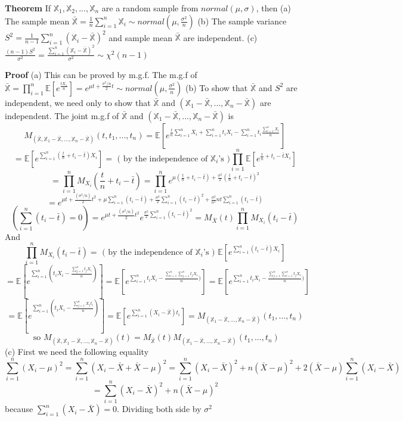\documentclass[a4paper,12pt]{article}
\begin{document}
\textbf{Theorem} If $\mathbb{X}_1, \mathbb{X}_2, ..., \mathbb{X}_n$ are a random sample from $normal(\mu, \sigma)$, then 
(a) The sample mean $\bar{\mathbb{X}} = \frac{1}{n}\sum_{i=1}^n\mathbb{X}_i \sim normal(\mu, \frac{\sigma^2}{n})$ 
(b) The sample variance $S^2 = \frac{1}{n-1} \sum_{i=1}^n (\mathbb{X}_i-\bar{\mathbb{X}})^2$ and sample mean $\bar{\mathbb{X}}$ are independent. 
(c) $\frac{(n-1)S^2}{\sigma^2} = \frac{\sum_{i=1}^n (\mathbb{X}_i-\bar{\mathbb{X}})^2}{\sigma^2} \sim \chi^2(n-1)$ 

\textbf{Proof} 
(a) This can be proved by m.g.f. The m.g.f of $\bar{\mathbb{X}} = \prod_{i=1}^n \mathbb{E}[e^{\frac{tX_1}{n}}] = e^{\mu t + \frac{\sigma^2 / n}{2}t} \sim normal(\mu, \frac{\sigma^2}{n})$ 
(b) To show that $\bar{\mathbb{X}}$ and $S^2$ are independent, we need only to show that $\bar{\mathbb{X}}$ and $(\mathbb{X}_1-\bar{\mathbb{X}}, ..., \mathbb{X}_n-\bar{\mathbb{X}})$ are independent.
The joint m.g.f of $\bar{\mathbb{X}}$ and $(\mathbb{X}_1-\bar{\mathbb{X}}, ..., \mathbb{X}_n-\bar{\mathbb{X}})$ is
$$M_{(\bar{\mathbb{X}}, \mathbb{X}_1-\bar{\mathbb{X}}, ..., \mathbb{X}_n-\bar{\mathbb{X}})}( t, t_1, ..., t_n ) = \mathbb{E}[e^{ \frac{t}{n}\sum_{i=1}^n X_i + \sum_{i=1}^n t_i X_i - \sum_{i=1}^n t_i \frac{\sum_{i=1}^n X_i}{n} }]$$
$$= \mathbb{E}[e^{\sum_{i=1}^n( \frac{t}{n}+t_i-\bar{t} )X_i}] = \text{ ( by the independence of } \mathbb{X}_i \text{'s )} \prod_{i=1}^n \mathbb{E}[e^{\frac{t}{n}+t_i-\bar{t} X_i}]$$
$$= \prod_{i=1}^n M_{X_i}(\frac{t}{n}+t_i-\bar{t}) = \prod_{i=1}^n e^{\mu (\frac{t}{n}+t_i-\bar{t}) + \frac{\sigma^2}{2} (\frac{t}{n}+t_i-\bar{t})^2 }$$
$$= e^{ \mu t + \frac{(\sigma^2/n)}{2}t^2 + \mu  \sum_{i=1}^n (t_i - \bar{t}) + \frac{\sigma^2}{2} \sum_{i=1}^n (t_i-\bar{t})^2 + \frac{\sigma^2}{n^2}nt \sum_{i=1}^n (t_i - \bar{t})}$$
$$( \sum_{i=1}^n (t_i - \bar{t}) = 0 ) = e^{ \mu t + \frac{(\sigma^2/n)}{2}t^2}e^{\frac{\sigma^2}{2} \sum_{i=1}^n (t_i-\bar{t})^2} = M_{\bar{X}}(t)\prod_{i=1}^n M_{X_i}(t_i-\bar{t})$$
And
$$\prod_{i=1}^n M_{X_i}(t_i-\bar{t}) =  \text{ ( by the independence of } \mathbb{X}_i \text{'s ) } \mathbb{E}[e^{ \sum_{i=1}^n (t_i-\bar{t})X_i }]$$
$$= \mathbb{E}[e^{ \sum_{i=1}^n (t_i X_i-\frac{\sum_{j=1}^n t_j X_i}{n}) }] = \mathbb{E}[e^{ \sum_{i=1}^n t_i X_i-\frac{\sum_{i=1}^n \sum_{j=1}^n t_j X_i}{n}) }] = \mathbb{E}[e^{ \sum_{i=1}^n t_i X_i-\frac{\sum_{j=1}^n \sum_{i=1}^n t_j X_i}{n}) }]$$
$$ = \mathbb{E}[e^{ \sum_{i=1}^n (t_i X_i-\frac{\sum_{j=1}^n X_j t_i}{n}) }] = \mathbb{E}[e^{ \sum_{i=1}^n (X_i-\bar{\mathbb{X}}) t_i} ] = M_{(\mathbb{X}_1-\bar{\mathbb{X}}, ..., \mathbb{X}_n-\bar{\mathbb{X}})}( t_1, ..., t_n )$$
$$\text{ so }M_{(\bar{\mathbb{X}}, \mathbb{X}_1-\bar{\mathbb{X}}, ..., \mathbb{X}_n-\bar{\mathbb{X}})}(t) = M_{\bar{\mathbb{X}}}(t) M_{(\mathbb{X}_1-\bar{\mathbb{X}}, ..., \mathbb{X}_n-\bar{\mathbb{X}})}( t_1, ..., t_n )$$ 
(c) First we need the following equality
$$\sum_{i=1}^n (X_i-\mu)^2 = \sum_{i=1}^n (X_i-\bar{X}+\bar{X}-\mu)^2 = \sum_{i=1}^n (X_i-\bar{X})^2 + n(\bar{X}-\mu)^2 + 2(\bar{X}-\mu)\sum_{i=1}^n(X_i-\bar{X})$$
$$= \sum_{i=1}^n (X_i-\bar{X})^2 + n(\bar{X}-\mu)^2$$ because $\sum_{i=1}^n(X_i-\bar{X}) = 0$. Dividing both side by $\sigma^2$
\end{document}
